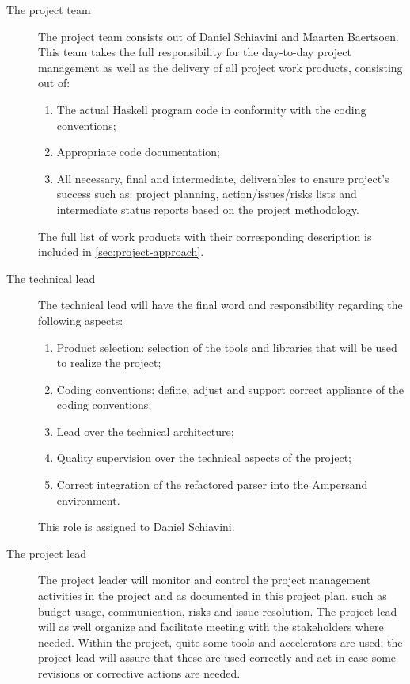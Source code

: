 \begin{description}
	\item[The project team]
	The project team consists out of Daniel Schiavini and Maarten Baertsoen.
	This team takes the full responsibility for the day-to-day project management as well as the delivery of all project work products, consisting out of:
	\begin{enumerate}
		\item The actual Haskell program code in conformity with the coding conventions;
		\item Appropriate code documentation;
		\item All necessary, final and intermediate, deliverables to ensure project's success such as: project planning, action/issues/risks lists and intermediate status reports based on the project methodology.
	\end {enumerate}
	The full list of work products with their corresponding description is included in \autoref{sec:project-approach}.
	
	\item[The technical lead]
	The technical lead will have the final word and responsibility regarding the following aspects:
	\begin{enumerate}
		\item 	Product selection: selection of the tools and libraries that will be used to realize the project;
		\item 	Coding conventions: define, adjust and support correct  appliance of the coding conventions;
		\item 	Lead over the technical architecture;
		\item 	Quality supervision over the technical aspects of the project;
		\item 	Correct integration of the refactored parser into the Ampersand environment.
	\end {enumerate}
	This role is assigned to Daniel Schiavini.

	\item[The project lead]
	The project leader will monitor and control the project management activities in the project and as documented in this project plan, such as budget usage, communication, risks and issue resolution.
	 The project lead will as well organize and facilitate meeting with the stakeholders where needed. 
	Within the project, quite some tools and accelerators are used; the project lead will assure that these are used correctly and act in case some revisions or corrective actions are needed.


\end{description}
